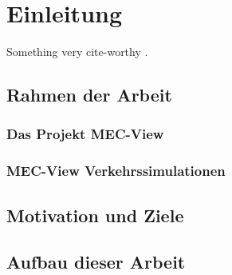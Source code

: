 
\chapter{Einleitung}
\label{cha:introduction}

Something very cite-worthy \cite{Fu2005}.

\section{Rahmen der Arbeit}
\label{sec:rahmen_arbeit}

\subsection{Das Projekt MEC-View}
\label{sec:mec_view}

\subsection{MEC-View Verkehrssimulationen}
\label{sec:mecview_sim}

\section{Motivation und Ziele}
\label{sec:motivation_goals}

\section{Aufbau dieser Arbeit}
\label{sec:aufbau}
